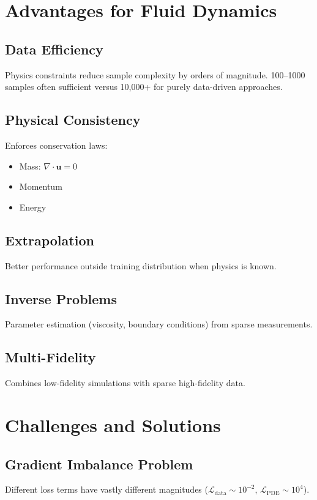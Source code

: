 \section{Advantages for Fluid Dynamics}

\subsection{Data Efficiency}
Physics constraints reduce sample complexity by orders of magnitude. 100--1000 samples often sufficient versus 10,000+ for purely data-driven approaches.

\subsection{Physical Consistency}
Enforces conservation laws:
\begin{itemize}
    \item Mass: $\nabla \cdot \mathbf{u} = 0$
    \item Momentum
    \item Energy
\end{itemize}

\subsection{Extrapolation}
Better performance outside training distribution when physics is known.

\subsection{Inverse Problems}
Parameter estimation (viscosity, boundary conditions) from sparse measurements.

\subsection{Multi-Fidelity}
Combines low-fidelity simulations with sparse high-fidelity data.

\section{Challenges and Solutions}

\subsection{Gradient Imbalance Problem}
Different loss terms have vastly different magnitudes ($\mathcal{L}_{\text{data}} \sim 10^{-2}$, $\mathcal{L}_{\text{PDE}} \sim 10^4$).

